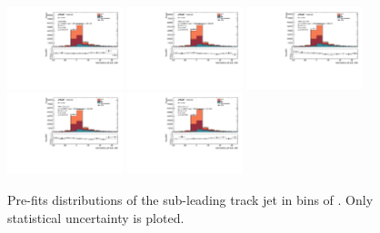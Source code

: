 \begin{figure}[htbp]
  \centering
 \includegraphics[width=0.3\textwidth]{figures/gbb/Sub_Sd0_Fits/Canv_PreFit_0-Deltatheta-0628_LpT_INF_SpT_INF_coarse_y.pdf}
 \includegraphics[width=0.3\textwidth]{figures/gbb/Sub_Sd0_Fits/Canv_PreFit_0628-Deltatheta-1256_LpT_INF_SpT_INF_coarse_y.pdf}
 \includegraphics[width=0.3\textwidth]{figures/gbb/Sub_Sd0_Fits/Canv_PreFit_1256-Deltatheta-1884_LpT_INF_SpT_INF_coarse_y.pdf}\\
 \includegraphics[width=0.3\textwidth]{figures/gbb/Sub_Sd0_Fits/Canv_PreFit_1884-Deltatheta-2512_LpT_INF_SpT_INF_coarse_y.pdf}
 \includegraphics[width=0.3\textwidth]{figures/gbb/Sub_Sd0_Fits/Canv_PreFit_2512-Deltatheta-3140_LpT_INF_SpT_INF_coarse_y.pdf}

\caption{Pre-fits \subsdzero distributions of the sub-leading track jet in bins of \dphi. Only statistical uncertainty is ploted.}
  \label{fig:dphi-prefits-subleading-sub}
\end{figure}

